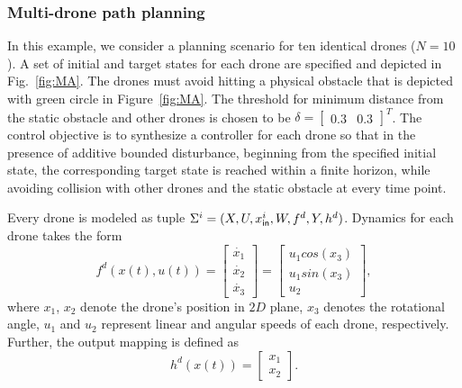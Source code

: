 \subsubsection{Multi-drone path planning}\label{sec:Multirobot}
In this example, we consider a planning scenario for ten identical drones ($N=10$). A set of initial and target states for each drone are specified and depicted in Fig.~\ref{fig:MA}. The drones must avoid hitting a physical obstacle that is depicted with green circle in Figure~\ref{fig:MA}. %
The threshold for minimum distance from the static obstacle and other drones is chosen to be $\delta=\begin{bmatrix}0.3&0.3\end{bmatrix}^T$. %
The control objective is to synthesize a controller for each drone so that in the presence of additive bounded disturbance, beginning from the specified initial state, the corresponding target state is reached within a finite horizon, while avoiding collision with other drones and the static obstacle at every time point. 

Every drone is modeled as tuple $\Sigma^i=(X,U,x_{\mathsf{in}}^i,W,f^d,Y,h^d)$. %
Dynamics for each drone takes the form
\begin{equation*}\label{eq:unicycle_ss}
	f^{d}(x(t),u(t))=
	\begin{bmatrix}
		\dot{x_1}\\
		\dot{x_2}\\
		\dot{x_3}
	\end{bmatrix}=
	\begin{bmatrix}
		u_1cos(x_3)\\
		u_1sin(x_3)\\
		u_2
	\end{bmatrix},
\end{equation*}
where $x_1$, $x_2$ denote the drone's position in $2D$ plane, $x_3$ denotes the rotational angle, $u_1$ and $u_2$ represent linear and angular speeds of each drone, respectively. Further, the output mapping is defined as
\[
h^d(x(t))=\begin{bmatrix}
	x_1\\x_2
\end{bmatrix}.
\]


